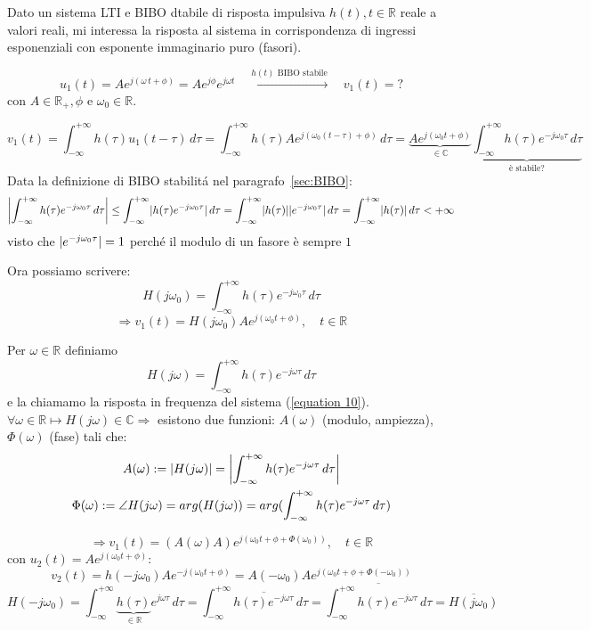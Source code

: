 Dato un sistema LTI e BIBO dtabile di risposta impulsiva $h(t), t \in \mathbb{R}$ reale a valori reali, mi interessa la risposta al sistema in corrispondenza di ingressi esponenziali con esponente immaginario puro (fasori).

\[ 
	 u_1(t) =Ae^{j(\omega \, t + \phi)}= Ae^{j\phi}e^{j\omega t} \quad \overset{h(t)\text{ BIBO stabile}}{\longmapsto} \quad v_1(t)=?
\]
con $A \in \mathbb{R_+}, \phi$ e $\omega_0 \in \mathbb{R}$. %

\[
	v_1(t) = \int_{-\infty}^{+\infty}h(\tau)u_1(t-\tau)\,d\tau
	= \int_{-\infty}^{+\infty}h(\tau)Ae^{j(\omega_0(t-\tau)+\phi)}\,d\tau
	= \underbrace{Ae^{j(\omega_0 t+\phi)}}_{\in \mathbb{C}} \underbrace{\int_{-\infty}^{+\infty}h(\tau)e^{-j\omega_0 \tau}\, d\tau}_{\text{è stabile?}}
\]
Data la definizione di BIBO stabilitá nel paragrafo~\ref{sec:BIBO}:
\[
	\Abs{\int_{-\infty}^{+\infty}h(\tau)e^{-j\omega_0 \tau}\, d\tau} 
	\le \int_{-\infty}^{+\infty}\abs{h(\tau)e^{-j\omega_0 \tau}}\, d\tau
	= \int_{-\infty}^{+\infty}\abs{h(\tau)}\abs{e^{-j\omega_0 \tau}}\, d\tau
	= \int_{-\infty}^{+\infty}\abs{h(\tau)}\, d\tau < +\infty
\]
visto che $\lvert e^{-j\omega_0 \tau}\rvert =1$ perché il modulo di un fasore è sempre $1$

Ora possiamo scrivere:
\[
	H(j\omega_0) = \int_{-\infty}^{+\infty}h(\tau)e^{-j\omega_0 \tau}\, d\tau
\]
\[
	\Rightarrow v_1(t)=H(j\omega_0) A e^{j(\omega_0 t + \phi)}, \quad t \in \mathbb{R}
\]

\begin{definizione}
	Per $ \omega \in \mathbb{R} $ definiamo
	\[
		H(j\omega)= \int_{-\infty}^{+\infty}h(\tau)e^{-j\omega \tau}\, d\tau
	\]
	e la chiamamo la risposta in frequenza del sistema (\ref{equation 10}).
	$ \forall\omega\in\mathbb{R} \mapsto H(j\omega)\in \mathbb{C} \Rightarrow$ esistono due funzioni: $ A(\omega) $ (modulo, ampiezza), $ \Phi(\omega) $ (fase) tali che:
	\begin{gather*}
		A(\omega):=\abs{H(j\omega)}=\Abs{\int_{-\infty}^{+\infty}h(\tau)e^{-j\omega \tau}\, d\tau}\\
		\Phi(\omega) := \angle H(j\omega)=arg(H(j\omega))=arg(\int_{-\infty}^{+\infty}h(\tau)e^{-j\omega \tau}\, d\tau)
	\end{gather*}
\end{definizione}

\[
	\Rightarrow v_1(t) =(A(\omega)A)e^{j(\omega_0 t+\phi+\Phi(\omega_0))} , \quad t \in \mathbb{R}
\]
con $ u_2(t)= A e^{j(\omega_0 t + \phi)}$:
\[
	v_2(t) =h(-j\omega_0)Ae^{-j(\omega_0 t+\phi)}=A(-\omega_0)Ae^{j(\omega_0 t+\phi+\Phi(-\omega_0))} %
\]
\[
	H(-j\omega_0)= \int_{-\infty}^{+\infty}\underbrace{h(\tau)}_{\in\mathbb{R}}e^{j\omega \tau}\, d\tau
	= \int_{-\infty}^{+\infty}\overline{h(\tau)e^{-j\omega \tau}}\, d\tau
	= \overline{\int_{-\infty}^{+\infty}h(\tau)e^{-j\omega \tau}\, d\tau}
	= \overline{H(j\omega_0)}
\]

